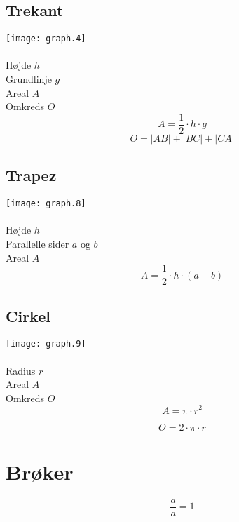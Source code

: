 \documentclass[11pt,a5paper,fleqn,leqno]{book}
\begin{document}
\subsection{Trekant}

\texttt{[image: graph.4]}
\\
\\
Højde $h$ \\
Grundlinje $g$ \\
Areal $A$ \\
Omkreds $O$
\begin{equation} \label{eq:areal_trekant}
A = \frac{1}{2} \cdot h \cdot g
\end{equation}
\begin{equation}
O = |AB| + |BC| + |CA|
\end{equation}

\subsection{Trapez}

\texttt{[image: graph.8]}
\\
\\
Højde $h$ \\
Parallelle sider $a$ og $b$ \\
Areal $A$
\begin{equation}
A = \frac{1}{2} \cdot h \cdot (a + b)
\end{equation}

\subsection{Cirkel}

\texttt{[image: graph.9]}
\\
\\
Radius $r$ \\
Areal $A$ \\
Omkreds $O$
\begin{equation} \label{eq:areal_cirkel}
A = \pi \cdot r^2
\end{equation}

\begin{equation} \label{eq:omkreds_cirkel}
O = 2 \cdot \pi \cdot r
\end{equation}

\section{Brøker}

\begin{equation} \label{eq:taeller_naevner_det_samme}
\frac{a}{a} = 1
\end{equation}
\end{document}
